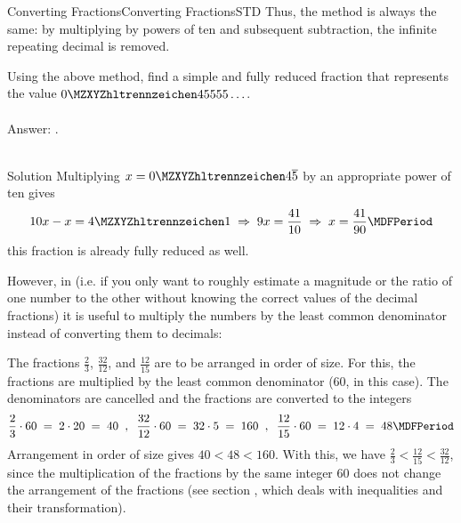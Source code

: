 \begin{MXContent}{Converting Fractions}{Converting Fractions}{STD}
Thus, the method is always the same: by multiplying by powers of ten and subsequent 
subtraction, the infinite repeating decimal is removed.

\begin{MExercise}
Using the above method, find a simple and fully reduced fraction that represents the
value $\MZahl{0}{45555}\ldots$.
\ \\ \ \\
Answer: .
\ \\
\ \\
\begin{MHint}{Solution}
Multiplying $x=\MZahl{0}{4}\overline{5}$ by an appropriate power of ten gives
$$
10x-x=\MZahl{4}{1}\;\Rightarrow\; 9x=\Mdfrac{41}{10}\;\Rightarrow\;x=\Mdfrac{41}{90} \MDFPeriod
$$
this fraction is already fully reduced as well.
\end{MHint}
\end{MExercise}

However, in  
(i.e. if you only want to roughly estimate a magnitude or the ratio of one number to the other without 
knowing the correct values of the decimal fractions) it is useful to multiply the numbers by the least 
common denominator instead of converting them to decimals:

\begin{MExample}
The fractions $\frac23$, $\frac{32}{12}$, and $\frac{12}{15}$ are to be arranged in order of size.
For this, the fractions are multiplied by the least common denominator ($60$, in this case). 
The denominators are cancelled and the fractions are converted to the integers
$$
\frac23\cdot 60\;=\; 2\cdot 20\;=\; 40 \;\; ,\;\;
\frac{32}{12}\cdot 60 \;=\; 32\cdot 5\;=\; 160 \;\; , \;\;
\frac{12}{15}\cdot 60 \;=\; 12\cdot 4 \;=\; 48 \MDFPeriod
$$
Arrangement in order of size gives $40<48<160$. With this, we have $\frac23<\frac{12}{15}<\frac{32}{12}$, 
since the multiplication of the fractions by the same integer $60$ does not change the arrangement of
the fractions (see section , which deals with inequalities and their 
transformation).
\end{MExample}


\end{MXContent}
